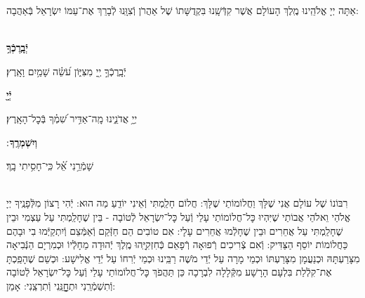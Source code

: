 \documentclass[twoside, openany, parskip=half, 11pt]{book}
\begin{document}
אַתָּה יְיָ אֱלֹהֵֽינוּ מֶֽלֶךְ הָעוֹלָם אֲשֶׁר קִדְּֿשָֽׁנוּ בִּקְדֻשָּׁתוֹ שֶׁל אַהֲרֹן וְֿצִוָּֽנוּ לְֿבָרֵךְ אֶת־עַמּוֹ יִשְׂרָאֵל בְּֿאַהֲבָה:


\\
\textbf{יְֿבָֽרֶכְֿךָ֥}
\hfill \begin{footnotesize}
 יְֿבָֽרֶכְֿךָ֣ יְ֖יָ מִצִּיּ֑וֹן עֹ֝שֵׂ֗ה שָׁמַ֥יִם וָאָֽרֶץ׃\\
\end{footnotesize}
\textbf{יְֿיָ֖}
\hfill \begin{footnotesize}
 יְיָ֥ אֲדֹנֵ֑ינוּ מָֽה־אַדִּ֥יר שִׁ֝מְ֗ךָ בְּֿכׇל־הָאָֽרֶץ׃\\
\end{footnotesize}
\textbf{וְיִשְׁמְרֶֽךָ}
׃ \hfill \begin{footnotesize}
 שָׁמְֿרֵ֥נִי אֵ֝֗ל כִּֽי־חָסִ֥יתִי בָֽךְ׃
\end{footnotesize}

\\

רִבּוֹנוֹ שֶׁל עוֹלָם אֲנִי שֶׁלָּךְ וַחֲלוֹמוֹתַי שֶׁלָּךְ: חֲלוֹם חָלַֽמְתִּי וְֿאֵינִי יוֹדֵֽעַ מַה הוּא: יְֿהִי רָצוֹן מִלְּֿפָנֶֽיךָ יְיָ אֱלֹהַי וֵאלֹהֵי אֲבוֹתַי שֶׁיִּהְיוּ כׇּל־חֲלוֹמוֹתַי עָלַי וְֿעַל כׇּל־יִשְׂרָאֵל לְֿטוֹבָה - בֵּין שֶׁחָלַֽמְתִּי עַל עַצְמִי וּבֵין שֶׁחָלַֽמְתִּי עַל אֲחֵרִים וּבֵין שֶׁחָלְֿמוּ אֲחֵרִים עָלָי: אִם טוֹבִים הֵם חַזְּֿקֵם וְֿאַמְּֿצֵם וְֿיִתְקַיְּֿמוּ בִי וּבָהֶם כַּחֲלוֹמוֹת יוֹסֵף הַצַּדִּיק: וְֿאִם צְֿרִיכִים רְֿפוּאָה רְֿפָאֵם כְּֿחִזְקִיָּֽהוּ מֶֽלֶךְ יְֿהוּדָה מֵחָלְֿיוֹ וּכְמִרְיָם הַנְּֿבִיאָה מִצָּרַעְתָּהּ וּכְנַעֲמָן מִצָּרַעְתּוֹ וּכְמֵי מָרָה עַל יְֿדֵי מֹשֶׁה רַבֵּֽינוּ וּכְמֵי יְֿרִחוֹ עַל יְֿדֵי אֱלִישָׁע: וּכְשֵׁם שֶׁהָפַֽכְתָּ אֶת־קִלְֿלַת בִּלְעָם הָרָשָׁע מִקְּֿלָלָה לִבְרָכָה כֵּן תַּהֲפֹךְ כׇּל־חֲלוֹמוֹתַי עָלַי וְֿעַל כׇּל־יִשְׂרָאֵל לְֿטוֹבָה וְֿתִשְׁמְֿרֵֽנִי וּתְחׇׇׇׇׇָנֵּֽנִי וְֿתִרְצֵֽנִי: אָמֵן:
\end{document}

